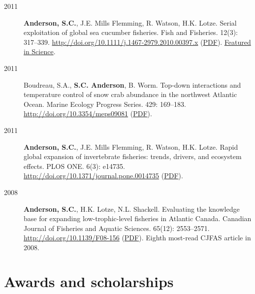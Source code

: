 \begin{description}
\item[2011]
\textbf{Anderson, S.C.}, J.E. Mills Flemming, R. Watson, H.K. Lotze.
Serial exploitation of global sea cucumber fisheries. Fish and
Fisheries. 12(3): 317--339.
\url{http://doi.org/10.1111/j.1467-2979.2010.00397.x}
(\href{https://dl.dropboxusercontent.com/u/254940/papers/Anderson_etal_2011_seacucumbers_with_supplement.pdf}{PDF}).
\href{http://www.sciencemag.org/content/331/6014/129.1.full}{Featured in
Science}.
\item[2011]
Boudreau, S.A., \textbf{S.C. Anderson}, B. Worm. Top-down interactions
and temperature control of snow crab abundance in the northwest Atlantic
Ocean. Marine Ecology Progress Series. 429: 169--183.
\url{http://doi.org/10.3354/meps09081}
(\href{http://www.int-res.com/articles/meps_oa/m429p169.pdf}{PDF}).
\item[2011]
\textbf{Anderson, S.C.}, J.E. Mills Flemming, R. Watson, H.K. Lotze.
Rapid global expansion of invertebrate fisheries: trends, drivers, and
ecosystem effects. PLOS ONE. 6(3): e14735.
\url{http://doi.org/10.1371/journal.pone.0014735}
(\href{http://www.plosone.org/article/fetchObject.action?uri=info\%3Adoi\%2F10.1371\%2Fjournal.pone.0014735\&representation=PDF}{PDF}).
\item[2008]
\textbf{Anderson, S.C.}, H.K. Lotze, N.L. Shackell. Evaluating the
knowledge base for expanding low-trophic-level fisheries in Atlantic
Canada. Canadian Journal of Fisheries and Aquatic Sciences. 65(12):
2553--2571. \url{http://doi.org/10.1139/F08-156}
(\href{https://dl.dropboxusercontent.com/u/254940/papers/Anderson_etal_2008_knowledge.pdf}{PDF}).
Eighth most-read CJFAS article in 2008.
\end{description}

\section{Awards and scholarships}\label{awards-and-scholarships}


